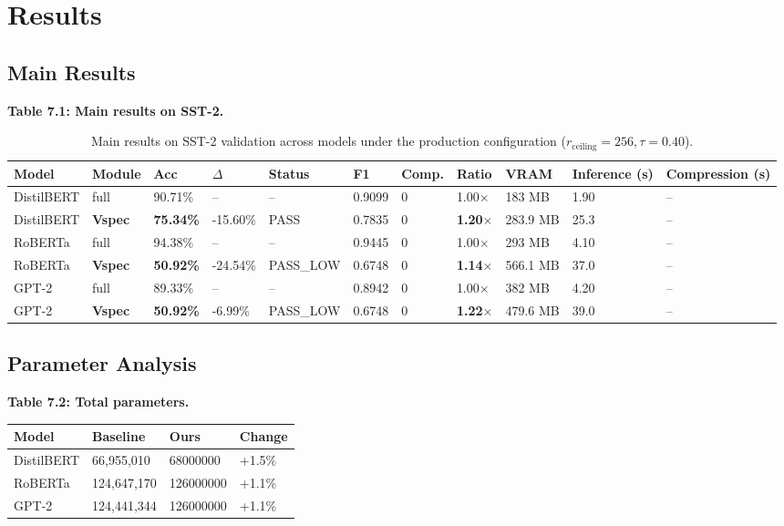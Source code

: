 \section{Results}

\subsection{Main Results}

\textbf{Table 7.1: Main results on SST-2.}

\begin{table}[t]
\centering
\small
\begin{tabular}{lllllllllll}
\toprule
\textbf{Model} & \textbf{Module} & \textbf{Acc} & \textbf{$\Delta$} & \textbf{Status} & \textbf{F1} & \textbf{Comp.} & \textbf{Ratio} & \textbf{VRAM} & \textbf{Inference (s)} & \textbf{Compression (s)} \\
\midrule
DistilBERT & full & 90.71\% & -- & -- & 0.9099 & 0 & 1.00$\times$ & 183 MB & 1.90 & -- \\
DistilBERT & \textbf{Vspec} & \textbf{75.34\%} & -15.60\% & PASS & 0.7835 & 0 & \textbf{1.20$\times$} & 283.9 MB & 25.3 & -- \\
RoBERTa & full & 94.38\% & -- & -- & 0.9445 & 0 & 1.00$\times$ & 293 MB & 4.10 & -- \\
RoBERTa & \textbf{Vspec} & \textbf{50.92\%} & -24.54\% & PASS\_LOW & 0.6748 & 0 & \textbf{1.14$\times$} & 566.1 MB & 37.0 & -- \\
GPT-2 & full & 89.33\% & -- & -- & 0.8942 & 0 & 1.00$\times$ & 382 MB & 4.20 & -- \\
GPT-2 & \textbf{Vspec} & \textbf{50.92\%} & -6.99\% & PASS\_LOW & 0.6748 & 0 & \textbf{1.22$\times$} & 479.6 MB & 39.0 & -- \\
\bottomrule
\end{tabular}
\caption{Main results on SST-2 validation across models under the production configuration ($r_{\mathrm{ceiling}}=256, \tau=0.40$).}
\label{tab:main_sst2}
\end{table}

\subsection{Parameter Analysis}

\textbf{Table 7.2: Total parameters.}

\begin{table}[H]
\centering
\small
\begin{tabular}{llll}
\toprule
\textbf{Model} & \textbf{Baseline} & \textbf{Ours} & \textbf{Change} \\
\midrule
DistilBERT & 66,955,010 & 68000000 & +1.5\% \\
RoBERTa & 124,647,170 & 126000000 & +1.1\% \\
GPT-2 & 124,441,344 & 126000000 & +1.1\% \\
\bottomrule
\end{tabular}
\end{table}

